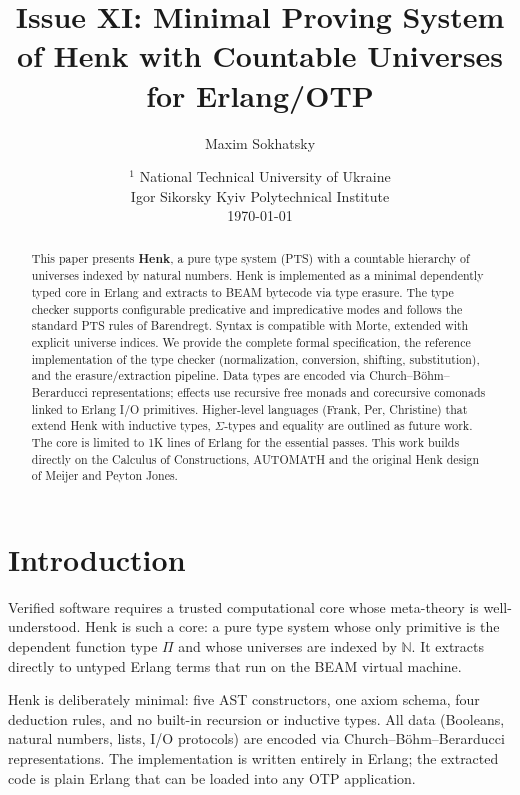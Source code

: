 \documentclass{article}
\begin{document}
\title{Issue XI: Minimal Proving System of Henk with Countable Universes for Erlang/OTP}
\author{Maxim Sokhatsky}
\date{ $^1$ National Technical University of Ukraine \\
       \small Igor Sikorsky Kyiv Polytechnical Institute\\
       \today }

\maketitle

\begin{abstract}
This paper presents \textbf{Henk}, a pure type system (PTS) with a countable hierarchy of universes indexed by natural numbers.
Henk is implemented as a minimal dependently typed core in Erlang and extracts to BEAM bytecode via type erasure.
The type checker supports configurable predicative and impredicative modes and follows the standard PTS rules of Barendregt.
Syntax is compatible with Morte, extended with explicit universe indices. We provide the complete formal specification,
the reference implementation of the type checker (normalization, conversion, shifting, substitution),
and the erasure/extraction pipeline. Data types are encoded via Church--Böhm--Berarducci representations;
effects use recursive free monads and corecursive comonads linked to Erlang I/O primitives.
Higher-level languages (Frank, Per, Christine) that extend Henk with inductive types, $\Sigma$-types and equality are outlined as future work.
The core is limited to 1K lines of Erlang for the essential passes.
This work builds directly on the Calculus of Constructions, AUTOMATH and the original Henk design of Meijer and Peyton Jones.
\end{abstract}

\ifincludeTOC
  \tableofcontents
\else
\fi

\newpage
\section{Introduction}
Verified software requires a trusted computational core whose meta-theory is well-understood.
Henk is such a core: a pure type system whose only primitive is the dependent function type $\Pi$ and whose universes are indexed by $\mathbb{N}$.
It extracts directly to untyped Erlang terms that run on the BEAM virtual machine.

Henk is deliberately minimal: five AST constructors, one axiom schema, four deduction rules, and no built-in recursion or inductive types.
All data (Booleans, natural numbers, lists, I/O protocols) are encoded via Church--Böhm--Berarducci representations.
The implementation is written entirely in Erlang; the extracted code is plain Erlang that can be loaded into any OTP application.
\end{document}
